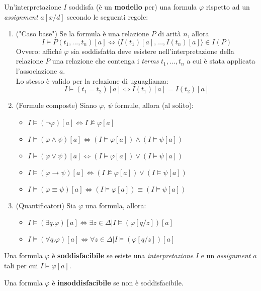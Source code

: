 Un'interpretazione $I$ soddisfa (è un \textbf{modello} per) una formula $\varphi$ rispetto ad un \textit{assignment} $a[x/d]$ secondo le seguenti regole:
\begin{enumerate}
\item ("Caso base") Se la formula è una relazione $P$ di arità $n$, allora $$I \models P(t_1, ..., t_n)[a] \iff \langle I(t_1)[a], ..., I(t_n)[a] \rangle \in I(P)$$
Ovvero: affiché $\varphi$ sia soddisfatta deve esistere nell'interpretazione della relazione $P$ una relazione che contenga i \textit{terms} $t_1, ..., t_n$ a cui è stata applicata l'associazione $a$.\\
Lo stesso è valido per la relazione di uguaglianza: $$I \models (t_1 = t_2)[a] \iff I(t_1)[a] = I(t_2)[a]$$
\item (Formule composte) Siano $\varphi$, $\psi$ formule, allora (al solito):
\begin{itemize}
\item $I \models (\lnot \varphi ) [a] \iff I \not\models \varphi [a]$
\item $I \models (\varphi \land \psi) [a] \iff (I \models \varphi [a]) \land (I \models \psi [a])$
\item $I \models (\varphi \lor \psi) [a] \iff (I \models \varphi [a]) \lor (I \models \psi [a])$
\item $I \models (\varphi \to \psi) [a] \iff (I \not\models \varphi [a]) \lor (I \models \psi [a])$
\item $I \models (\varphi \equiv \psi) [a] \iff (I \models \varphi [a]) \equiv (I \models \psi [a])$
\end{itemize}
\vspace{1em}
\item (Quantificatori) Sia $\varphi$ una formula, allora:
\begin{itemize}
\item $I \models (\exists q. \varphi)[a] \iff \exists z \in \Delta | I \models (\varphi[q/z])[a]$
\item $I \models (\forall q. \varphi)[a] \iff \forall z \in \Delta | I \models (\varphi[q/z])[a]$
\end{itemize}
\end{enumerate}

Una formula $\varphi$ è \textbf{soddisfacibile} se esiste una \textit{interpretazione} $I$ e un \textit{assignment} $a$ tali per cui $I \models \varphi[a]$.

Una formula $\varphi$ è \textbf{insoddisfacibile} se non è soddisfacibile.

